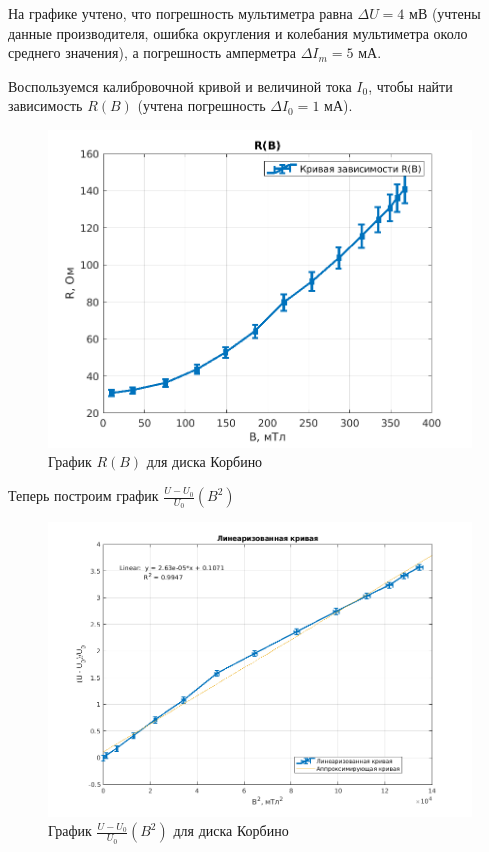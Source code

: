 На графике учтено, что погрешность мультиметра равна $\Delta U = 4$ мВ (учтены данные производителя, ошибка округления и колебания мультиметра около среднего значения), а погрешность амперметра $\Delta I_m = 5$ мА. 

Воспользуемся калибровочной кривой и величиной тока $I_0$, чтобы найти зависимость $R(B)$ (учтена погрешность $\Delta I_0 = 1$ мА).

\begin{figure}[h!]
    \centering
    \includegraphics[width = 11 cm]{images/RB.png}
    \caption{График $R(B)$ для диска Корбино}
    \label{RB}
\end{figure}

Теперь построим график $\frac{U - U_0}{U_0}(B^2)$

\begin{figure}[h!]
    \centering
    \includegraphics[width = 14 cm]{images/U0B2.png}
    \caption{График $\frac{U - U_0}{U_0}(B^2)$ для диска Корбино}
    \label{U0B2}
\end{figure}

